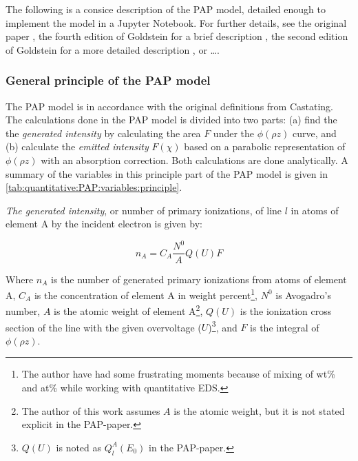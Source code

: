 The following is a consice description of the PAP model, detailed enough to implement the model in a Jupyter Notebook. For further details, see the original paper \cite{pap_1991}, the fourth edition of Goldstein for a brief description \cite{goldstein_scanning_2018}, the second edition of Goldstein for a more detailed description \cite{goldstein_2ed_1992}, or \dots {}.








\subsubsection{General principle of the PAP model}
\label{theory:quantitative:pap:general_principle}

The PAP model is in accordance with the original definitions from Castating.
The calculations done in the PAP model is divided into two parts: (a) find the the \emph{generated intensity} by calculating the area $F$ under the $\phi(\rho z)$ curve, and (b) calculate the \emph{emitted intensity} $F(\chi)$ based on a parabolic representation of $\phi(\rho z)$ with an absorption correction.
Both calculations are done analytically.
A summary of the variables in this principle part of the PAP model is given in \cref{tab:quantitative:PAP:variables:principle}.


\emph{The generated intensity}, or number of primary ionizations, of line $l$ in atoms of element A by the incident electron is given by:

\begin{equation}
    \label{eq:theory:quantitative:pap:general_principle:n_a}
    n_A = C_A \frac{N^0}{A} Q(U) F
\end{equation}

Where $n_A$ is the number of generated primary ionizations from atoms of element A, $C_A$ is the concentration of element A in weight percent\footnote{The author have had some frustrating moments because of mixing of wt\% and at\% while working with quantitative EDS.}, $N^0$ is Avogadro's number, $A$ is the atomic weight of element A\footnote{The author of this work assumes $A$ is the atomic weight, but it is not stated explicit in the PAP-paper.}, $Q(U)$ is the ionization cross section of the line with the given overvoltage ($U$)\footnote{$Q(U)$ is noted as $Q_l^A(E_0)$ in the PAP-paper.}, and $F$ is the integral of $\phi(\rho z)$.

